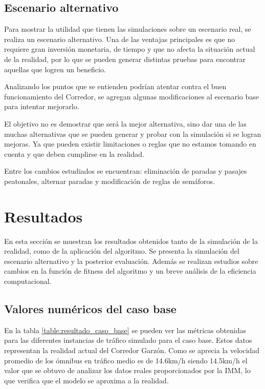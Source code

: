 

\subsection{Escenario alternativo}

Para mostrar la utilidad que tienen las simulaciones sobre un escenario real, se realiza un escenario alternativo. Una de las ventajas principales es que no requiere gran inversión monetaria, de tiempo y que no afecta la situación actual de la realidad, por lo que se pueden generar distintas pruebas para encontrar aquellas que logren un beneficio.

Analizando los puntos que se entienden podrían atentar contra el buen funcionamiento del Corredor, se agregan algunas modificaciones al escenario base para intentar mejorarlo. 

El objetivo no es demostrar que será la mejor alternativa, sino dar una de las muchas alternativas que se pueden generar y probar con la simulación si se logran mejoras. Ya que pueden existir limitaciones o reglas que no estamos tomando en cuenta y que deben cumplirse en la realidad.

Entre los cambios estudiados se encuentran: eliminación de paradas y pasajes peatonales, alternar paradas y modificación de reglas de semáforos.



\section{Resultados}
En esta sección se muestran los resultados obtenidos tanto de la simulación de la realidad, como de la aplicación del algoritmo. Se presenta la simulación del escenario alternativo y la posterior evaluación. Además se realizan estudios sobre cambios en la función de fitness del algoritmo y un breve análisis de la eficiencia computacional.


\subsection{Valores numéricos del caso base}

En la tabla \ref{table:resultado_caso_base} se pueden ver las métricas obtenidas para las diferentes instancias de tráfico simulado para el caso base. Estos datos representan la realidad actual del Corredor Garzón. Como se aprecia la velocidad promedio de los ómnibus en tráfico medio es de 14.6km/h siendo 14.5km/h el valor que se obtuvo de analizar los datos reales proporcionados por la IMM, lo que verifica que el modelo se aproxima a la realidad. 
 
